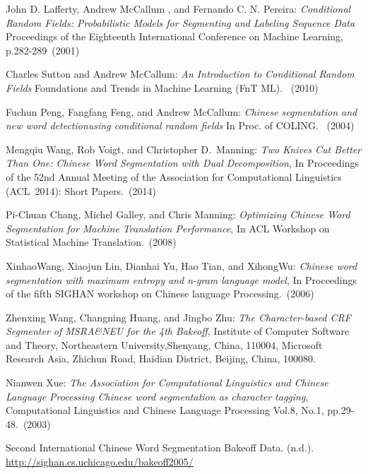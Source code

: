 \documentclass[UTF8,11pt]{article}
\begin{document}
\begin{thebibliography}{99}

John D. Lafferty, Andrew McCallum , and Fernando C. N. Pereira:
\emph{Conditional Random Fields: Probabilistic Models for Segmenting and Labeling Sequence Data} 
Proceedings of the Eighteenth International Conference on Machine Learning, p.282-289~(2001)

 Charles Sutton and Andrew McCallum:
\emph{An Introduction to Conditional Random Fields}
Foundations and Trends in Machine Learning (FnT ML). ~(2010)

Fuchun Peng, Fangfang Feng, and Andrew McCallum:
\emph{Chinese segmentation and new word detectionusing conditional random fields} 
In Proc. of COLING. ~(2004)

 Mengqiu Wang, Rob Voigt, and Christopher D.~Manning:
\emph{Two Knives Cut Better Than One: Chinese Word Segmentation with Dual Decomposition},
In Proceedings of the 52nd Annual Meeting of the Association for Computational Linguistics (ACL~2014): Short Papers.~(2014)

 Pi-Chuan Chang, Michel Galley, and Chris Manning:
\emph{Optimizing Chinese Word Segmentation for Machine Translation Performance},
In ACL Workshop on Statistical Machine Translation.~(2008)

 XinhaoWang, Xiaojun Lin, Dianhai Yu, Hao Tian, and XihongWu:
\emph{Chinese word segmentation with maximum entropy and n-gram language model},
In Proceedings of the fifth SIGHAN workshop on Chinese language Processing.~(2006)

 Zhenxing Wang, Changning Huang, and Jingbo Zhu:
\emph{The Character-based CRF Segmenter of MSRA\&NEU for the 4th Bakeoff},
Institute of Computer Software and Theory, Northeastern University,Shenyang, China, 110004, Microsoft Research Asia, Zhichun Road, Haidian District, Beijing, China, 100080.

 Nianwen Xue:
\emph{The Association for Computational Linguistics and Chinese Language Processing Chinese word segmentation as character tagging},
Computational Linguistics and Chinese Language Processing Vol.8, No.1, pp.29-48.~(2003)

 Second International Chinese Word Segmentation Bakeoff Data. (n.d.). \\
\url{http://sighan.cs.uchicago.edu/bakeoff2005/}


\end{thebibliography}
\end{document}
